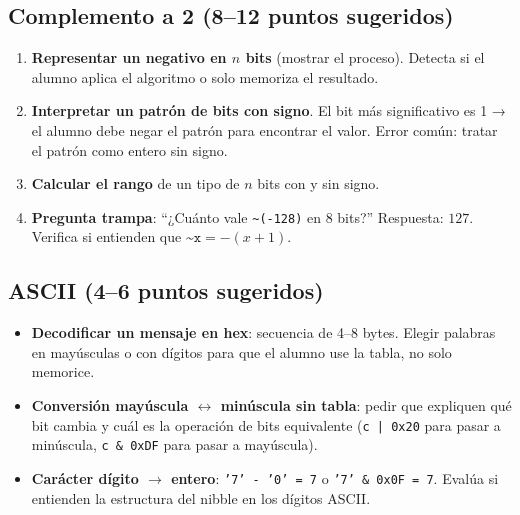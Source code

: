 \documentclass[12pt, oneside]{article}
\begin{document}
\subsection{Complemento a 2 (8–12 puntos sugeridos)}

\begin{notaprofesor}
  \begin{enumerate}
    \item \textbf{Representar un negativo en $n$ bits} (mostrar el proceso).
          Detecta si el alumno aplica el algoritmo o solo memoriza el resultado.
    \item \textbf{Interpretar un patrón de bits con signo}.
          El bit más significativo es 1 → el alumno debe negar el patrón para
          encontrar el valor.  Error común: tratar el patrón como entero sin signo.
    \item \textbf{Calcular el rango} de un tipo de $n$ bits con y sin signo.
    \item \textbf{Pregunta trampa}: ``¿Cuánto vale \texttt{\textasciitilde(-128)}
          en 8 bits?''  Respuesta: $127$.  Verifica si entienden que $\texttt{\textasciitilde x} = -(x+1)$.
  \end{enumerate}
\end{notaprofesor}

\subsection{ASCII (4–6 puntos sugeridos)}

\begin{notaprofesor}
  \begin{itemize}
    \item \textbf{Decodificar un mensaje en hex}: secuencia de 4–8 bytes.
          Elegir palabras en mayúsculas o con dígitos para que el alumno use
          la tabla, no solo memorice.
    \item \textbf{Conversión mayúscula $\leftrightarrow$ minúscula sin tabla}:
          pedir que expliquen qué bit cambia y cuál es la operación de bits
          equivalente (\texttt{c | 0x20} para pasar a minúscula,
          \texttt{c \& 0xDF} para pasar a mayúscula).
    \item \textbf{Carácter dígito $\to$ entero}: \texttt{'7' - '0' = 7} o
          \texttt{'7' \& 0x0F = 7}.  Evalúa si entienden la estructura del
          nibble en los dígitos ASCII.
  \end{itemize}
\end{notaprofesor}
\end{document}
